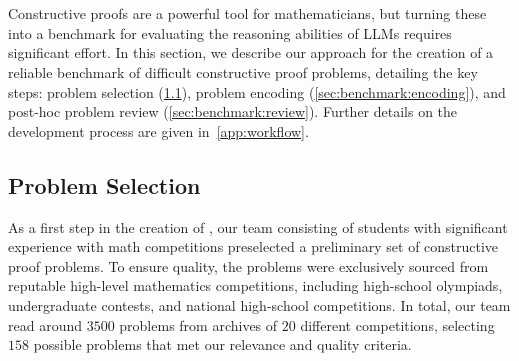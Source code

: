 \section{\mc} \label{sec:benchmark}

Constructive proofs are a powerful tool for mathematicians, but turning these into a benchmark for evaluating the reasoning abilities of LLMs requires significant effort. 
In this section, we describe our approach for the creation of a reliable benchmark of difficult constructive proof problems, detailing the key steps: problem selection (\cref{sec:benchmark:selection}), problem encoding (\cref{sec:benchmark:encoding}), and post-hoc problem review (\cref{sec:benchmark:review}). Further details on the development process are given in~\cref{app:workflow}.




\subsection{Problem Selection} \label{sec:benchmark:selection}
As a first step in the creation of \mc, our team consisting of students with significant experience with math competitions preselected a preliminary set of constructive proof problems.
To ensure quality, the problems were exclusively sourced from reputable high-level mathematics competitions, including high-school olympiads, undergraduate contests, and national high-school competitions.
In total, our team read around $3500$ problems from archives of $20$ different competitions, selecting $158$ possible problems that met our relevance and quality criteria.

